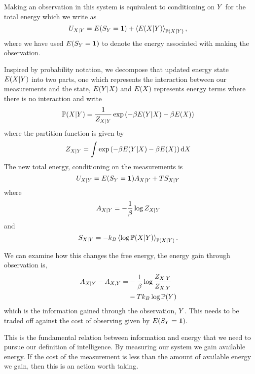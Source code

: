 \documentclass[]{article}
\begin{document}
Making an observation in this system is equivalent to conditioning on
\(Y\) for the total energy which we write as 
\[
U_{X|Y} = E(S_Y=\mathbf{1}) +  \left\langle E({X|Y}) \right\rangle_{\mathbb{P}({X|Y})},
\]
where we have used $E(S_Y=\mathbf{1})$ to denote the energy associated with making the observation.

Inspired by probability notation, we decompose that updated energy
state \(E(X| Y)\) into two parts, one which
represents the interaction between our measurements and the state,
\(E(Y|X)\) and \(E(X)\)
represents energy terms where there is no interaction and write 
\[
\mathbb{P}({X|Y}) = \frac{1}{Z_{X|Y}} \exp\left(-\beta E(Y|X) -\beta E(X)\right)
\] 
where the partition function is given by 
\[
Z_{X|Y} = \int \exp\left(-\beta E(Y|X) -\beta E(X)\right) \text{d}X
\] 
The new total energy, conditioning on the measurements is 
\[
U_{X|Y} = E(S_Y=\mathbf{1})  A_{X|Y} + TS_{X|Y}
\] 
where 
\[
A_{X|Y} = - \frac{1}{\beta}\log Z_{X|Y}
\] 
and 
\[
S_{X|Y} = -k_B \left\langle \log \mathbb{P}({X|Y}) \right\rangle_{\mathbb{P}({X|Y})}.
\]

We can examine how this changes the free energy, the energy gain through
observation is, 
\begin{align*}
A_{X|Y} - A_{X,Y} = & -\frac{1}{\beta} \log \frac{Z_{X|Y}}{Z_{X,Y}}\\
& -T k_B \log \mathbb{P}(Y)
\end{align*}
which is the information gained through the observation, \(Y\). This needs to be traded off against the cost of observing given by $E(S_Y=\mathbf{1}) $.

This is the fundamental relation between information and energy that we need to pursue our definition of intelligence. By measuring our system we gain available energy. If the cost of the measurement is less than the amount of available energy we gain, then this is an action worth taking. 
\end{document}
